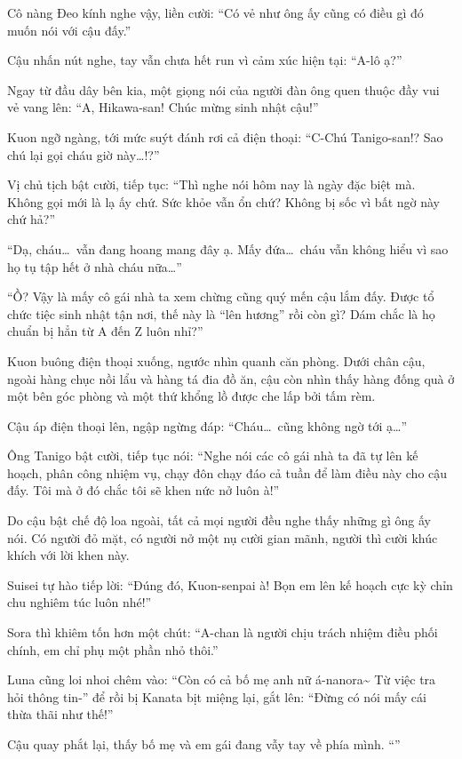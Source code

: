 \documentclass[../main.tex]{subfiles}
\begin{document}
Cô nàng Đeo kính nghe vậy, liền cười: ``Có vẻ như ông ấy cũng có điều gì đó muốn nói với cậu đấy.''

Cậu nhấn nút nghe, tay vẫn chưa hết run vì cảm xúc hiện tại: ``A-lô ạ?''

Ngay từ đầu dây bên kia, một giọng nói của người đàn ông quen thuộc đầy vui vẻ vang lên: ``A, Hikawa-san! Chúc mừng sinh nhật cậu!''

Kuon ngỡ ngàng, tới mức suýt đánh rơi cả điện thoại: ``C-Chú Tanigo-san!? Sao chú lại gọi cháu giờ này\dots!?''

Vị chủ tịch bật cười, tiếp tục: ``Thì nghe nói hôm nay là ngày đặc biệt mà. Không gọi mới là lạ ấy chứ. Sức khỏe vẫn ổn chứ? Không bị sốc vì bất ngờ này chứ hả?''

``Dạ, cháu\dots\ vẫn đang hoang mang đây ạ. Mấy đứa\dots\ cháu vẫn không hiểu vì sao họ tụ tập hết ở nhà cháu nữa\dots''

``Ồ? Vậy là mấy cô gái nhà ta xem chừng cũng quý mến cậu lắm đấy. Được tổ chức tiệc sinh nhật tận nơi, thế này là ``lên hương'' rồi còn gì? Dám chắc là họ chuẩn bị hẳn từ A đến Z luôn nhỉ?''

Kuon buông điện thoại xuống, ngước nhìn quanh căn phòng. Dưới chân cậu, ngoài hàng chục nồi lẩu và hàng tá đia đồ ăn, cậu còn nhìn thấy hàng đống quà ở một bên góc phòng và một thứ khổng lồ được che lấp bởi tấm rèm.

Cậu áp điện thoại lên, ngập ngừng đáp: ``Cháu\dots\ cũng không ngờ tới ạ\dots''

Ông Tanigo bật cười, tiếp tục nói: ``Nghe nói các cô gái nhà ta đã tự lên kế hoạch, phân công nhiệm vụ, chạy đôn chạy đáo cả tuần để làm điều này cho cậu đấy. Tôi mà ở đó chắc tôi sẽ khen nức nở luôn à!''

Do cậu bật chế độ loa ngoài, tất cả mọi người đều nghe thấy những gì ông ấy nói. Có người đỏ mặt, có người nở một nụ cười gian mãnh, người thì cười khúc khích với lời khen này.

Suisei tự hào tiếp lời: ``Đúng đó, Kuon-senpai à! Bọn em lên kế hoạch cực kỳ chỉn chu nghiêm túc luôn nhé!''

Sora thì khiêm tốn hơn một chút: ``A-chan là người chịu trách nhiệm điều phối chính, em chỉ phụ một phần nhỏ thôi.''

Luna cũng loi nhoi chêm vào: ``Còn có cả bố mẹ anh nữ á-nanora\~{} Từ việc tra hỏi thông tin-'' để rồi bị Kanata bịt miệng lại, gắt lên: ``Đừng có nói mấy cái thừa thãi như thế!''

Cậu quay phắt lại, thấy bố mẹ và em gái đang vẫy tay về phía mình. ``''
\end{document}
